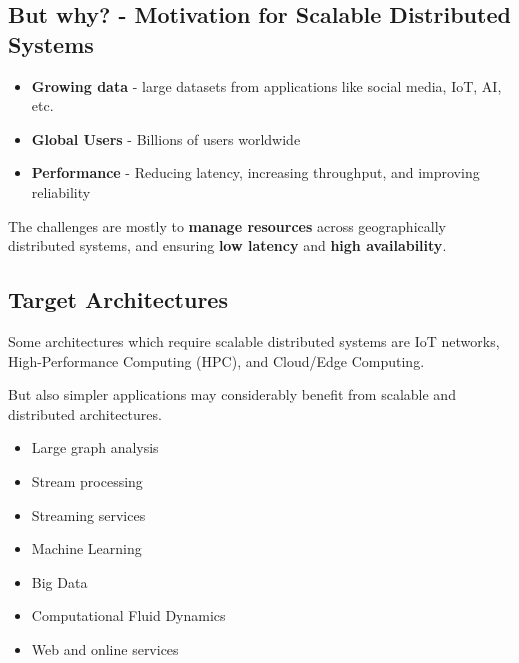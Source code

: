 \subsection{But why? - Motivation for Scalable Distributed Systems}
\begin{itemize}
   \item \textbf{Growing data} - large datasets from applications like social media, IoT, AI, etc.
   \item \textbf{Global Users} - Billions of users worldwide
   \item \textbf{Performance} - Reducing latency, increasing throughput, and improving reliability
\end{itemize}

The challenges are mostly to \textbf{manage resources} across geographically distributed systems, and ensuring \textbf{low latency} and \textbf{high availability}.

\subsection{Target Architectures}
Some architectures which require scalable distributed systems are IoT networks, High-Performance Computing (HPC), and Cloud/Edge Computing.


{But also simpler applications may considerably benefit from scalable and distributed architectures.\ns
\begin{itemize}
   \item Large graph analysis
   \item Stream processing
   \item Streaming services
   \item Machine Learning
   \item Big Data
   \item Computational Fluid Dynamics
   \item Web and online services
\end{itemize}}

